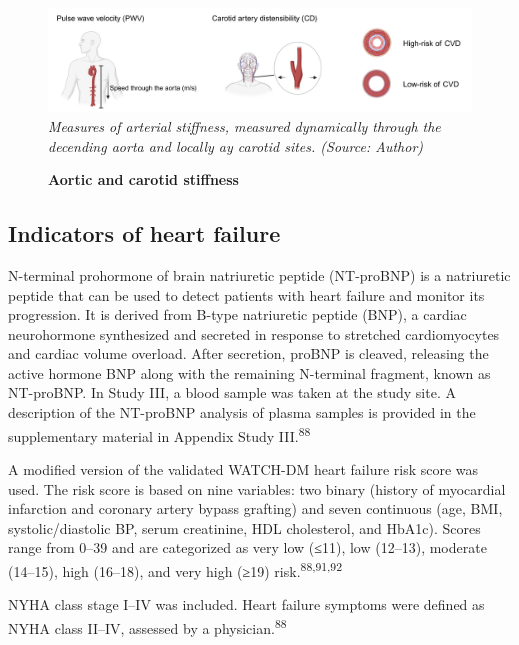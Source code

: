 \documentclass[
  a4paper,
  headsepline=true,
  open=left]{scrbook}
\begin{document}
\begin{figure}

{\centering 

\includegraphics{images/Methods_arterial_stiffness.pdf} \emph{Measures
of arterial stiffness, measured dynamically through the decending aorta
and locally ay carotid sites. (Source: Author)}

}

\caption{\label{fig-as}\textbf{Aortic and carotid stiffness}}

\end{figure}

\hypertarget{indicators-of-heart-failure}{%
\subsection{Indicators of heart
failure}\label{indicators-of-heart-failure}}

N-terminal prohormone of brain natriuretic peptide (NT-proBNP) is a
natriuretic peptide that can be used to detect patients with heart
failure and monitor its progression. It is derived from B-type
natriuretic peptide (BNP), a cardiac neurohormone synthesized and
secreted in response to stretched cardiomyocytes and cardiac volume
overload. After secretion, proBNP is cleaved, releasing the active
hormone BNP along with the remaining N-terminal fragment, known as
NT-proBNP. In Study III, a blood sample was taken at the study site. A
description of the NT-proBNP analysis of plasma samples is provided in
the supplementary material in Appendix Study III.\textsuperscript{88}

A modified version of the validated WATCH-DM heart failure risk score
was used. The risk score is based on nine variables: two binary (history
of myocardial infarction and coronary artery bypass grafting) and seven
continuous (age, BMI, systolic/diastolic BP, serum creatinine, HDL
cholesterol, and HbA1c). Scores range from 0--39 and are categorized as
very low (≤11), low (12--13), moderate (14--15), high (16--18), and very
high (≥19) risk.\textsuperscript{88,91,92}

NYHA class stage I--IV was included. Heart failure symptoms were defined
as NYHA class II--IV, assessed by a physician.\textsuperscript{88}
\end{document}

